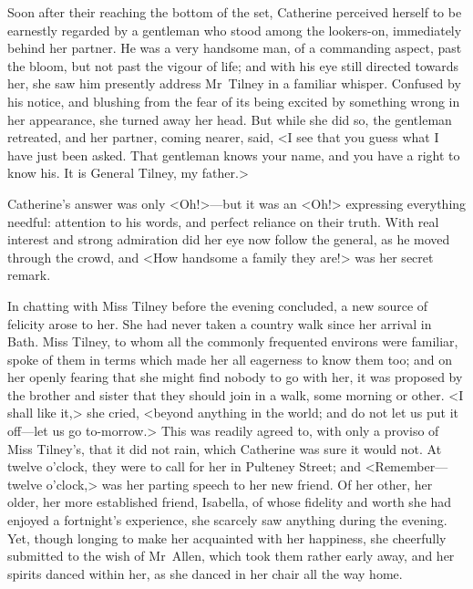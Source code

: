  Soon after their reaching the bottom of the set, Catherine perceived herself to be earnestly regarded by a gentleman who stood among the lookers-on, immediately behind her partner. He was a very handsome man, of a commanding aspect, past the bloom, but not past the vigour of life; and with his eye still directed towards her, she saw him presently address Mr~Tilney in a familiar whisper. Confused by his notice, and blushing from the fear of its being excited by something wrong in her appearance, she turned away her head. But while she did so, the gentleman retreated, and her partner, coming nearer, said, <I see that you guess what I have just been asked. That gentleman knows your name, and you have a right to know his. It is General Tilney, my father.> 

 Catherine's answer was only <Oh!>—but it was an <Oh!> expressing everything needful: attention to his words, and perfect reliance on their truth. With real interest and strong admiration did her eye now follow the general, as he moved through the crowd, and <How handsome a family they are!> was her secret remark. 

 In chatting with Miss Tilney before the evening concluded, a new source of felicity arose to her. She had never taken a country walk since her arrival in Bath. Miss Tilney, to whom all the commonly frequented environs were familiar, spoke of them in terms which made her all eagerness to know them too; and on her openly fearing that she might find nobody to go with her, it was proposed by the brother and sister that they should join in a walk, some morning or other. <I shall like it,> she cried, <beyond anything in the world; and do not let us put it off—let us go to-morrow.> This was readily agreed to, with only a proviso of Miss Tilney's, that it did not rain, which Catherine was sure it would not. At twelve o'clock, they were to call for her in Pulteney Street; and <Remember—twelve o'clock,> was her parting speech to her new friend. Of her other, her older, her more established friend, Isabella, of whose fidelity and worth she had enjoyed a fortnight's experience, she scarcely saw anything during the evening. Yet, though longing to make her acquainted with her happiness, she cheerfully submitted to the wish of Mr~Allen, which took them rather early away, and her spirits danced within her, as she danced in her chair all the way home. 